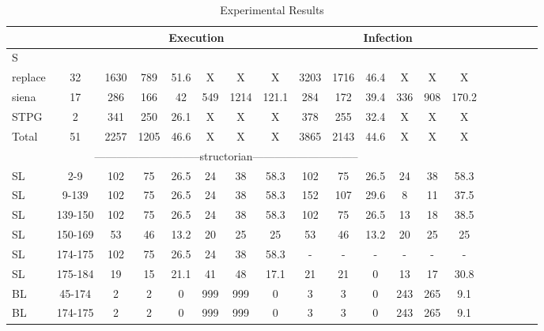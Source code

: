\begin{table*}
\begin{CodeOut}
\begin{center}
\caption {\label{table:all_results}Experimental Results}
\begin {tabular} {|l|c|c|c|c|c|c|c|c|c|c|c|c|c|c|c|c|c|c|}
\hline
&&\multicolumn{6}{|c|}{Execution}&\multicolumn{6}{|c|}{Infection}\\ 
\hline
S &\CenterCell{V} &\CenterCell{$E_{\CodeIn{Pex}}$}&\CenterCell{$E_{\CodeIn{eXpress}}$}&\CenterCell{$E_{Red}(\%)$ }&\CenterCell{$Ne_{\CodeIn{Pex}}$}&\CenterCell{$Ne_{\CodeIn{eXpress}}$}&\CenterCell{$Ne_{Inc}(\%)$}&\CenterCell{$I_{\CodeIn{Pex}}$}&\CenterCell{$I_{\CodeIn{eXpress}}$}&\CenterCell{$I_{Red}(\%)$}&\CenterCell{$Ni_{\CodeIn{Pex}}$}&\CenterCell{$Ni_{\CodeIn{eXpress}}$}&\CenterCell{$Ni_{Inc}(\%)$}\\

\hline
replace&32&1630&789&51.6&X&X&X&3203&1716&46.4&X&X&X\\
\hline
siena&17&286&166&42&549&1214&121.1&284&172&39.4&336&908&170.2\\
\hline
STPG&2&341&250&26.1&X&X&X&378&255&32.4&X&X&X\\
\hline
Total&51&2257&1205&46.6&X&X&X&3865&2143&44.6&X&X&X\\
\hline
\multicolumn{13}{|c|}{-----------------------------structorian-----------------------------}&\\
\hline
SL&2-9&102&75&26.5&24&38&58.3&102&75&26.5&24&38&58.3\\
\hline
SL&9-139&102&75&26.5&24&38&58.3&152&107&29.6&8&11&37.5\\
\hline
SL&139-150&102&75&26.5&24&38&58.3&102&75&26.5&13&18&38.5\\
\hline
SL&150-169&53&46&13.2&20&25&25&53&46&13.2&20&25&25\\
\hline
SL&174-175&102&75&26.5&24&38&58.3&-&-&-&-&-&-\\
\hline
SL&175-184&19&15&21.1&41&48&17.1&21&21&0&13&17&30.8\\
\hline
BL&45-174&2&2&0&999&999&0&3&3&0&243&265&9.1\\
\hline
BL&174-175&2&2&0&999&999&0&3&3&0&243&265&9.1\\
\hline


\end{tabular}
\end{center}
\end{CodeOut}
\end{table*}
